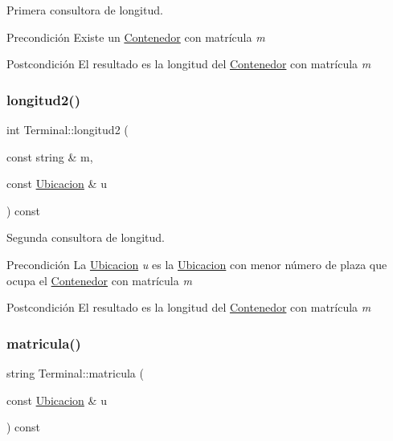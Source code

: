 Primera consultora de longitud. 

\begin{DoxyPrecond}{Precondición}
Existe un \hyperlink{class_contenedor}{Contenedor} con matrícula {\itshape m} 
\end{DoxyPrecond}
\begin{DoxyPostcond}{Postcondición}
El resultado es la longitud del \hyperlink{class_contenedor}{Contenedor} con matrícula {\itshape m} 
\end{DoxyPostcond}
\mbox{\label{class_terminal_a46db625d1ad0b3b0ddb69657d0711085}} 
\subsubsection{\texorpdfstring{longitud2()}{longitud2()}}
{\footnotesize\ttfamily int Terminal\+::longitud2 (\begin{DoxyParamCaption}\item[{const string \&}]{m,  }\item[{const \hyperlink{class_ubicacion}{Ubicacion} \&}]{u }\end{DoxyParamCaption}) const}



Segunda consultora de longitud. 

\begin{DoxyPrecond}{Precondición}
La \hyperlink{class_ubicacion}{Ubicacion} {\itshape u} es la \hyperlink{class_ubicacion}{Ubicacion} con menor número de plaza que ocupa el \hyperlink{class_contenedor}{Contenedor} con matrícula {\itshape m} 
\end{DoxyPrecond}
\begin{DoxyPostcond}{Postcondición}
El resultado es la longitud del \hyperlink{class_contenedor}{Contenedor} con matrícula {\itshape m} 
\end{DoxyPostcond}
\mbox{\label{class_terminal_a674811a7b56f57ff5b447d10565e923b}} 
\subsubsection{\texorpdfstring{matricula()}{matricula()}}
{\footnotesize\ttfamily string Terminal\+::matricula (\begin{DoxyParamCaption}\item[{const \hyperlink{class_ubicacion}{Ubicacion} \&}]{u }\end{DoxyParamCaption}) const}



